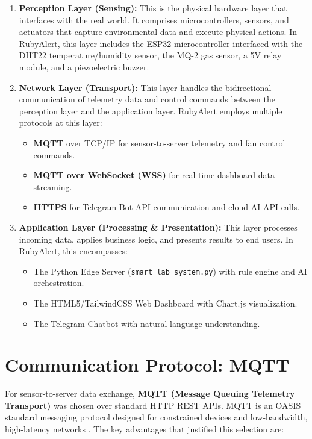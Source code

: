 \documentclass[12pt,a4paper]{report}
\begin{document}
\begin{enumerate}[leftmargin=2cm]
    \item \textbf{Perception Layer (Sensing):} This is the physical hardware layer that interfaces with the real world. It comprises microcontrollers, sensors, and actuators that capture environmental data and execute physical actions. In RubyAlert, this layer includes the ESP32 microcontroller interfaced with the DHT22 temperature/humidity sensor, the MQ-2 gas sensor, a 5V relay module, and a piezoelectric buzzer.
    
    \item \textbf{Network Layer (Transport):} This layer handles the bidirectional communication of telemetry data and control commands between the perception layer and the application layer. RubyAlert employs multiple protocols at this layer:
    \begin{itemize}
        \item \textbf{MQTT} over TCP/IP for sensor-to-server telemetry and fan control commands.
        \item \textbf{MQTT over WebSocket (WSS)} for real-time dashboard data streaming.
        \item \textbf{HTTPS} for Telegram Bot API communication and cloud AI API calls.
    \end{itemize}
    
    \item \textbf{Application Layer (Processing \& Presentation):} This layer processes incoming data, applies business logic, and presents results to end users. In RubyAlert, this encompasses:
    \begin{itemize}
        \item The Python Edge Server (\texttt{smart\_lab\_system.py}) with rule engine and AI orchestration.
        \item The HTML5/TailwindCSS Web Dashboard with Chart.js visualization.
        \item The Telegram Chatbot with natural language understanding.
    \end{itemize}
\end{enumerate}

\section{Communication Protocol: MQTT}
For sensor-to-server data exchange, \textbf{MQTT (Message Queuing Telemetry Transport)} was chosen over standard HTTP REST APIs. MQTT is an OASIS standard messaging protocol designed for constrained devices and low-bandwidth, high-latency networks \cite{mqtt}. The key advantages that justified this selection are:
\end{document}
